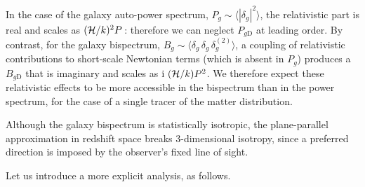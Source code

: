 In the case of  the galaxy {auto}-power spectrum, $P_g\sim \langle |\delta_g|^2\rangle$, the relativistic part is {real and scales as} $(\mathcal{H}/k)^2P$\,:  therefore we can neglect $P_{g\mathrm{D}}$ at leading order. By contrast, for the galaxy bispectrum, $B_g\sim \langle \delta_g\,\delta_g \, \delta^{(2)}_g\rangle$, a coupling of relativistic contributions to short-scale Newtonian terms (which  is absent in $P_g$) produces a $B_{g\mathrm{D}}$ that is {imaginary and scales as} ${\mathrm{i\,}}\,(\mathcal{H}/k)P^2$. 
We therefore expect these relativistic effects to be more accessible in the bispectrum than in the power spectrum, for the case of a single tracer {of the matter distribution}. 

Although the galaxy bispectrum is statistically isotropic, the plane-parallel approximation in redshift space breaks 3-dimensional isotropy, since a preferred direction is imposed by the observer's fixed line of sight. 

Let us introduce a more explicit analysis, as follows.

